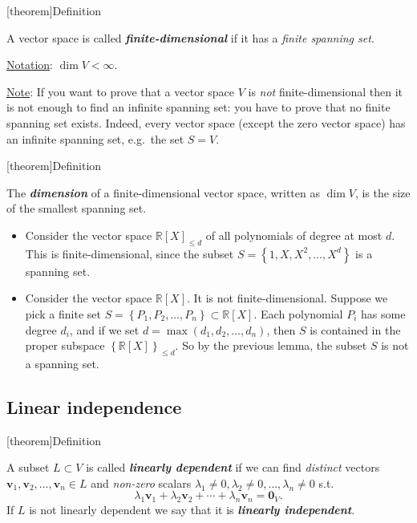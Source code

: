 \documentclass[12pt]{report}
\theoremstyle{definition}
\begin{document}
[theorem]{Definition}
\begin{finite spanning set}
    A vector space is called \textbf{\emph{finite-dimensional}} if it has a \emph{finite spanning set}.
\end{finite spanning set}

\underline{Notation}: $\dim{V} < \infty$.

\underline{Note}: If you want to prove that a vector space $V$ is \emph{not} finite-dimensional
then it is not enough to find an infinite spanning set: you have to prove that no finite spanning set exists.
Indeed, every vector space (except the zero vector space) has an infinite spanning set, 
e.g.\ the set $S = V$.

[theorem]{Definition}
\begin{dimension def}
    The \textbf{\emph{dimension}} of a finite-dimensional vector space,
    written as $\dim{V}$,
    is the size of the smallest spanning set.
\end{dimension def}

\begin{ex}
    \begin{itemize}
        \,

            \item 
    Consider the vector space ${\mathbb{R}[X]}_{\le d}$ of all polynomials of degree at most $d$.
    This is finite-dimensional, since the subset $S = \left\{1, X, X^{2},\ldots,X^{d}\right\} $
    is a spanning set.
\item Consider the vector space $\mathbb{R}[X]$. It is not finite-dimensional.
    Suppose we pick a finite set $S = \left\{P_1,P_2,\ldots,P_n\right\} \subset \mathbb{R}[X]$.
    Each polynomial $P_i$ has some degree $d_i$, and if we set $d = \max{(d_1, d_2,\ldots,d_n)}$,
    then $S$ is contained in the proper subspace ${\left\{\mathbb{R}[X]\right\}}_{\le d}$.
    So by the previous lemma, the subset $S$ is not a spanning set.
    \end{itemize}
    
\end{ex}

\subsection{Linear independence}

[theorem]{Definition}
\begin{linear independence}
    A subset $L \subset V$ is called \textbf{\emph{linearly dependent}} if
    we can find \emph{distinct} vectors $\pmb{v}_1, \pmb{v}_2,\ldots,\pmb{v}_n \in L$
    and \emph{non-zero} scalars $\lambda_1 \neq 0, \lambda_2 \neq 0,\ldots,\lambda_n \neq 0$ s.t.\[
        \lambda_1 \pmb{v}_1 + \lambda_2 \pmb{v}_2 + \cdots + \lambda_n \pmb{v}_n = \pmb{0}_V.
    \]
    If $L$ is not linearly dependent we say that it is \textbf{\emph{linearly independent}}.
\end{linear independence}
\end{document}
